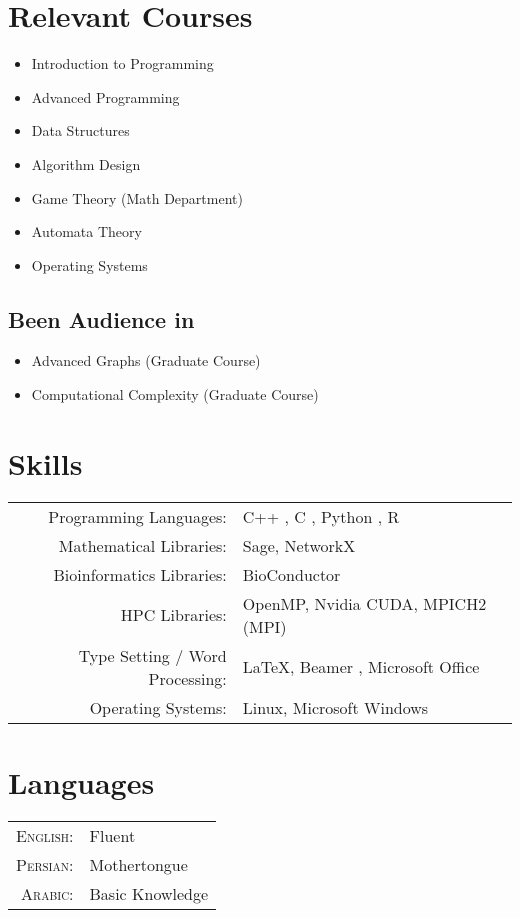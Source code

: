 \documentclass[a4paper,10pt]{article}
\begin{document}
\section{Relevant Courses}
\begin{itemize}	
	\item Introduction to Programming
	\item Advanced Programming
	\item Data Structures 
	\item Algorithm Design
	\item Game Theory (Math Department)
	\item Automata Theory 
	\item Operating Systems
	
\end{itemize}

\subsection*{Been Audience in}
\begin{itemize}
	\item Advanced Graphs (Graduate Course)
	\item Computational Complexity (Graduate Course)
\end{itemize}

\section{Skills}
\begin{tabular}{rl}
	Programming Languages:& C++ , C , Python , R \\ 
	Mathematical Libraries: & Sage, NetworkX \\
	Bioinformatics Libraries: & BioConductor \\
	HPC Libraries:& OpenMP, Nvidia CUDA, MPICH2 (MPI) \\
	Type Setting / Word Processing:& \LaTeX , Beamer , Microsoft Office \\
	Operating Systems: & Linux, Microsoft Windows \\
\end{tabular}

\section{Languages}
\begin{tabular}{rl}
 \textsc{English:}& Fluent \\
\textsc{Persian:}& Mothertongue\\
\textsc{Arabic:}& Basic Knowledge\\
\end{tabular}
\end{document}
